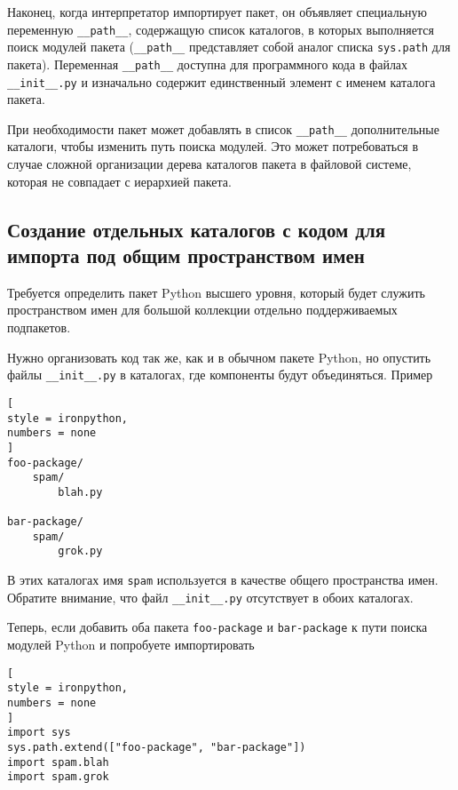 \documentclass[%
	11pt,
	a4paper,
	utf8,
		]{article}
\begin{document}




Наконец, когда интерпретатор импортирует пакет, он объявляет специальную переменную \verb|__path__|, содержащую список каталогов, в которых выполняется поиск модулей пакета (\verb|__path__| представляет собой аналог списка \texttt{sys.path} для пакета). Переменная \verb|__path__| доступна для программного кода в файлах \verb|__init__.py| и изначально содержит единственный элемент с именем каталога пакета.

При необходимости пакет может добавлять в список \verb|__path__| дополнительные каталоги, чтобы изменить путь поиска модулей. Это может потребоваться в случае сложной организации дерева каталогов пакета в файловой системе, которая не совпадает с иерархией пакета.

\subsection{Создание отдельных каталогов с кодом для импорта под общим пространством имен}

Требуется определить пакет Python высшего уровня, который будет служить пространством имен для большой коллекции отдельно поддерживаемых подпакетов.

Нужно организовать код так же, как и в обычном пакете Python, но опустить файлы \verb|__init__.py| в каталогах, где компоненты будут объединяться. Пример \cite[]{beazley:python_cookbook-2019}
\begin{lstlisting}[
style = ironpython,
numbers = none
]
foo-package/
    spam/
        blah.py
        
bar-package/
    spam/
        grok.py
\end{lstlisting}

В этих каталогах имя \texttt{spam} используется в качестве общего пространства имен. Обратите внимание, что файл \verb|__init__.py| отсутствует в обоих каталогах.

Теперь, если добавить оба пакета \texttt{foo-package} и \texttt{bar-package} к пути поиска модулей Python и попробуете импортировать
\begin{lstlisting}[
style = ironpython,
numbers = none
]
import sys
sys.path.extend(["foo-package", "bar-package"])
import spam.blah
import spam.grok
\end{lstlisting}
\end{document}
